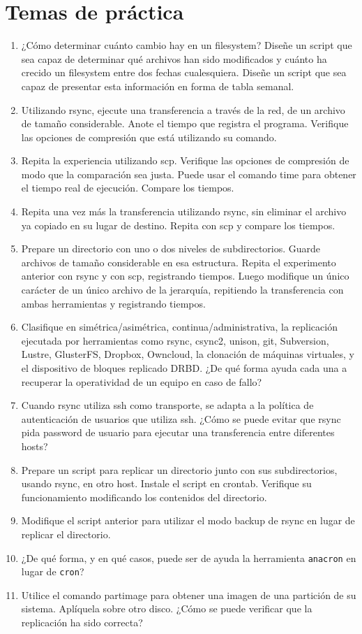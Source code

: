 \section{Temas de práctica}
\begin{enumerate}
	\item ¿Cómo determinar cuánto cambio hay en un filesystem? Diseñe un script que sea capaz de determinar qué archivos han sido modificados y cuánto ha crecido un filesystem entre dos fechas cualesquiera. Diseñe un script que sea capaz de presentar esta información en forma de tabla semanal. 
	\item Utilizando rsync, ejecute una transferencia a través de la red, de un archivo de tamaño considerable. Anote el tiempo que registra el programa. Verifique las opciones de compresión que está utilizando su comando.
	\item Repita la experiencia utilizando scp. Verifique las opciones de compresión de modo que la comparación sea justa. Puede usar el comando time para obtener el tiempo real de ejecución. Compare los tiempos. 
	\item Repita una vez más la transferencia utilizando rsync, sin eliminar el archivo ya copiado en su lugar de destino. Repita con scp y compare los tiempos.
	\item Prepare un directorio con uno o dos niveles de subdirectorios. Guarde archivos de tamaño considerable en esa estructura. Repita el experimento anterior con rsync y con scp, registrando tiempos. Luego modifique un único carácter de un único archivo de la jerarquía, repitiendo la transferencia con ambas herramientas y registrando tiempos.
	\item Clasifique en simétrica/asimétrica, continua/administrativa, la replicación ejecutada por herramientas como rsync, csync2, unison, git, Subversion, Lustre, GlusterFS, Dropbox, Owncloud, la clonación de máquinas virtuales, y el dispositivo de bloques replicado DRBD. ¿De qué forma ayuda cada una a recuperar la operatividad de un equipo en caso de fallo?	
	\item Cuando rsync utiliza ssh como transporte, se adapta a la política de autenticación de usuarios que utiliza ssh. ¿Cómo se puede evitar que rsync pida password de usuario para ejecutar una transferencia entre diferentes hosts?
	\item Prepare un script para replicar un directorio junto con sus subdirectorios, usando rsync, en otro host. Instale el script en crontab. Verifique su funcionamiento modificando los contenidos del directorio.
	\item Modifique el script anterior para utilizar el modo backup de rsync en lugar de replicar el directorio.
	\item ¿De qué forma, y en qué casos, puede ser de ayuda la herramienta \lstinline$anacron$ en lugar de \lstinline$cron$? 
	\item Utilice el comando partimage para obtener una imagen de una partición de su sistema. Aplíquela sobre otro disco. ¿Cómo se puede verificar que la replicación ha sido correcta? 
\end{enumerate}
